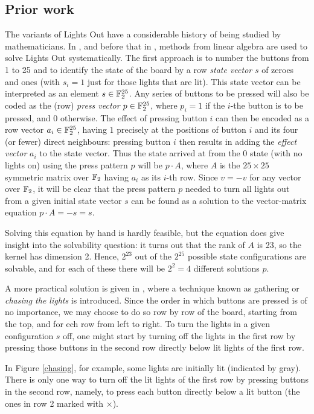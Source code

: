 \subsection*{Prior work}
The variants of Lights Out have a considerable history of
being studied by mathematicians. In \cite{anderson98}, and before that in
\cite{pelletier87}, methods from linear algebra are used to solve Lights
Out systematically.
The first approach is to number the buttons from 1 to 25 and to identify
the state of the board by a row {\it state vector} $s$ of zeroes and ones
(with $s_i=1$ just for those lights that are lit). This state vector can be
interpreted as an element $s\in\mathbb F_2^{25}$.
Any series of buttons to be pressed will also be coded as the (row) 
{\it press vector} $p\in\mathbb F_2^{25}$,
where $p_i=1$ if the $i$-the button is to be pressed, and 0 otherwise.
The effect of pressing button $i$ can then be encoded as a row vector
$a_i\in\mathbb F_2^{25}$, having $1$ precisely at the positions of button $i$
and its four (or fewer) direct neighbours: pressing button $i$ then
results in adding the {\it effect vector} $a_i$ to the state vector. Thus the state
arrived at from the 0 state (with no lights on) using the press
pattern $p$ will be $p\cdot A$, where $A$ is the $25\times 25$ 
symmetric matrix over $\mathbb F_2$ having $a_i$ as its $i$-th row.
Since $v=-v$ for any vector over $\mathbb F_2$, it will be clear
that the press pattern $p$ needed to turn all lights out
from a given initial state vector $s$ can be found as a
solution to the vector-matrix equation $p\cdot A=-s=s$.

Solving this equation by hand is hardly feasible, but the equation does give
insight into the solvability question: it turns out that the rank
of $A$ is 23, so the kernel has dimension 2. Hence,
$2^{23}$ out of the $2^{25}$ possible state configurations are solvable,
and for each of these there will be $2^2=4$ different solutions $p$.

A more practical solution is given in \cite{martin01}, where a technique
known as gathering or \emph{chasing the lights} is introduced.
Since the order in which buttons are pressed is of no importance,
we may choose to do so row by row of the board, starting from the top,
and for ech row from left to right. 
To turn the lights in a given configuration $s$ off,
one might start by turning off the lights in the first row by
pressing those buttons in the second row directly below lit lights
of the first row. 

In Figure \ref{chasing}, for example, some lights are initially
lit (indicated by gray).  There is only one way to turn off the
lit lights of the first row by pressing buttons
in the second row,
namely, to press each button directly below
a lit button (the ones in row 2 marked with $\times$).

